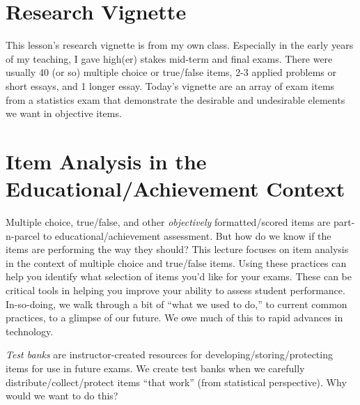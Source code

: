 \documentclass[
  english,
]{book}
\begin{document}
\hypertarget{research-vignette-3}{%
\section{Research Vignette}\label{research-vignette-3}}

This lesson's research vignette is from my own class. Especially in the early years of my teaching, I gave high(er) stakes mid-term and final exams. There were usually 40 (or so) multiple choice or true/false items, 2-3 applied problems or short essays, and 1 longer essay. Today's vignette are an array of exam items from a statistics exam that demonstrate the desirable and undesirable elements we want in objective items.

\hypertarget{item-analysis-in-the-educationalachievement-context}{%
\section{Item Analysis in the Educational/Achievement Context}\label{item-analysis-in-the-educationalachievement-context}}

Multiple choice, true/false, and other \emph{objectively} formatted/scored items are part-n-parcel to educational/achievement assessment. But how do we know if the items are performing the way they should? This lecture focuses on item analysis in the context of multiple choice and true/false items. Using these practices can help you identify what selection of items you'd like for your exams. These can be critical tools in helping you improve your ability to assess student performance.\\
In-so-doing, we walk through a bit of ``what we used to do,'' to current common practices, to a glimpse of our future. We owe much of this to rapid advances in technology.

\emph{Test banks} are instructor-created resources for developing/storing/protecting items for use in future exams. We create test banks when we carefully distribute/collect/protect items ``that work'' (from statistical perspective). Why would we want to do this?
\end{document}
